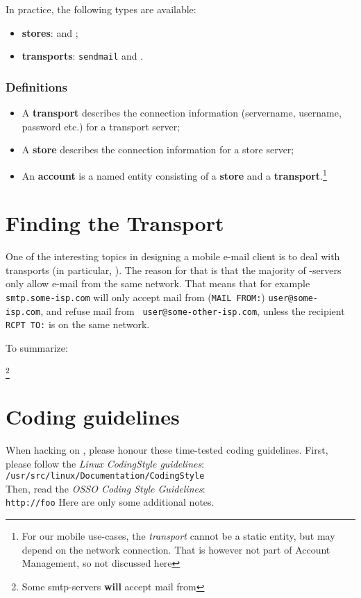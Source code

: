 \documentclass{book}
\begin{document}
In practice, the following types are available:
\begin{itemize}
  \item {\bf stores}: \pop and \imap;
  \item {\bf transports}: {\tt sendmail} and \smtp.
\end{itemize}

\subsection{Definitions}
\begin{itemize}
  \item A {\bf transport} describes the connection information (servername,
    username, password etc.) for a transport server;
  \item A {\bf store} describes the connection information for a store server;
  \item An {\bf account} is a named entity consisting of a {\bf store} and a
    {\bf transport}.\footnote{For our mobile use-cases, the {\em transport}
      cannot be a static entity, but may depend on the network
      connection. That is however not part of Account Management, so not
      discussed here}
\end{itemize}

\chapter{Finding the Transport}
One of the interesting topics in designing a mobile e-mail client is to deal
with transports (in particular, \smtp). The reason for that is that the
majority of \smtp-servers only allow e-mail from the same network. That means
that for example {\tt smtp.some-isp.com} will only accept mail from ({\tt MAIL
  FROM:}) {\tt user@some-isp.com}, and refuse mail from {\tt
  user@some-other-isp.com}, unless the recipient {\tt RCPT TO:} is on the same
network. 

To summarize:

\footnote{Some smtp-servers {\bf will} accept mail
  from} 



\chapter*{Coding guidelines}
When hacking on \modest, please honour these time-tested coding guidelines.
First, please follow the {\em Linux CodingStyle guidelines}:\\
       {\tt /usr/src/linux/Documentation/CodingStyle}\\
Then, read the {\em OSSO Coding Style Guidelines}:\\
        {\tt http://foo}
Here are only some additional notes.
\end{document}
